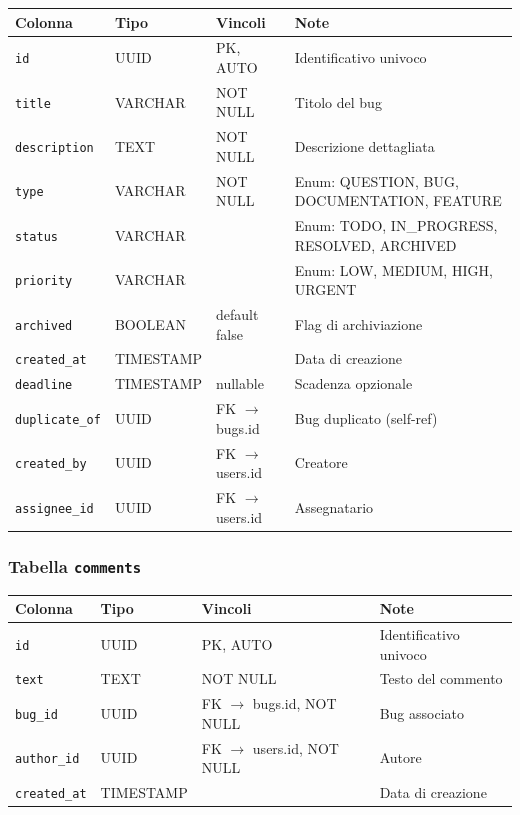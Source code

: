 \begin{center}
\small
\begin{tabular}{|l|l|l|p{4cm}|}
\hline
\textbf{Colonna} & \textbf{Tipo} & \textbf{Vincoli} & \textbf{Note} \\
\hline
\texttt{id} & UUID & PK, AUTO & Identificativo univoco \\
\hline
\texttt{title} & VARCHAR & NOT NULL & Titolo del bug \\
\hline
\texttt{description} & TEXT & NOT NULL & Descrizione dettagliata \\
\hline
\texttt{type} & VARCHAR & NOT NULL & Enum: QUESTION, BUG, DOCUMENTATION, FEATURE \\
\hline
\texttt{status} & VARCHAR & & Enum: TODO, IN\_PROGRESS, RESOLVED, ARCHIVED \\
\hline
\texttt{priority} & VARCHAR & & Enum: LOW, MEDIUM, HIGH, URGENT \\
\hline
\texttt{archived} & BOOLEAN & default false & Flag di archiviazione \\
\hline
\texttt{created\_at} & TIMESTAMP & & Data di creazione \\
\hline
\texttt{deadline} & TIMESTAMP & nullable & Scadenza opzionale \\
\hline
\texttt{duplicate\_of} & UUID & FK $\rightarrow$ bugs.id & Bug duplicato (self-ref) \\
\hline
\texttt{created\_by} & UUID & FK $\rightarrow$ users.id & Creatore \\
\hline
\texttt{assignee\_id} & UUID & FK $\rightarrow$ users.id & Assegnatario \\
\hline
\end{tabular}
\end{center}

\subsubsection{Tabella \texttt{comments}}

\begin{center}
\small
\begin{tabular}{|l|l|l|p{4cm}|}
\hline
\textbf{Colonna} & \textbf{Tipo} & \textbf{Vincoli} & \textbf{Note} \\
\hline
\texttt{id} & UUID & PK, AUTO & Identificativo univoco \\
\hline
\texttt{text} & TEXT & NOT NULL & Testo del commento \\
\hline
\texttt{bug\_id} & UUID & FK $\rightarrow$ bugs.id, NOT NULL & Bug associato \\
\hline
\texttt{author\_id} & UUID & FK $\rightarrow$ users.id, NOT NULL & Autore \\
\hline
\texttt{created\_at} & TIMESTAMP & & Data di creazione \\
\hline
\end{tabular}
\end{center}

